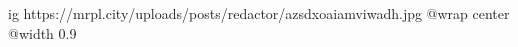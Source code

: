  
 
 
 
 

\ifcmt
  ig https://mrpl.city/uploads/posts/redactor/azsdxoaiamviwadh.jpg
  @wrap center
  @width 0.9
\fi
